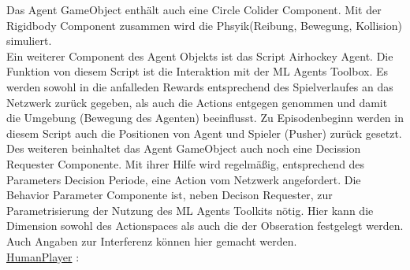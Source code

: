 Das Agent GameObject enthält auch eine Circle Colider Component. Mit der Rigidbody Component zusammen wird die Phsyik(Reibung, Bewegung, Kollision) simuliert.\\
Ein weiterer Component des Agent Objekts ist das Script Airhockey Agent. Die Funktion von diesem Script ist die Interaktion mit der ML Agents Toolbox. Es werden sowohl in die anfalleden Rewards entsprechend des Spielverlaufes an das  Netzwerk zurück gegeben, als auch die Actions entgegen genommen und damit die Umgebung (Bewegung des Agenten) beeinflusst. Zu Episodenbeginn werden in diesem Script auch die Positionen von Agent und Spieler (Pusher) zurück gesetzt. \\
Des weiteren beinhaltet das Agent GameObject auch noch eine Decission Requester Componente. Mit ihrer Hilfe wird regelmäßig, entsprechend des Parameters Decision Periode, eine Action vom Netzwerk angefordert. Die Behavior Parameter Componente ist, neben Decison Requester, zur Parametrisierung der Nutzung des ML Agents Toolkits nötig. Hier kann die Dimension sowohl des Actionspaces als auch die der  Obseration festgelegt werden. Auch Angaben zur Interferenz können hier gemacht werden. \\


\underline{HumanPlayer} :

